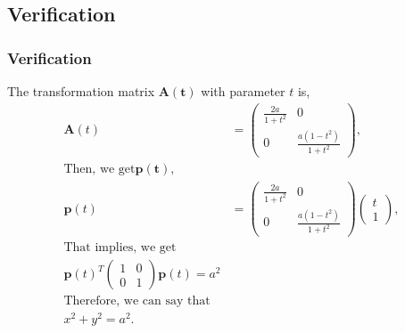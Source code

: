 \documentclass{beamer}
\theoremstyle{remark}
\newcommand{\myvec}[1]{\ensuremath{\begin{pmatrix}#1\end{pmatrix}}}
\let\vec\mathbf
\numberwithin{equation}{section}
\begin{document}
\subsection{Verification}
\begin{frame}
\frametitle{Verification}
	The transformation matrix $\vec{A(t)}$ with parameter $t$ is,\\
	\begin{align}
		\mathbf{A}(t) & = \myvec{ \frac{2a}{1+t^2} & 0 \\ 0 & \frac{a(1-t^2)}{1+t^2}},\\ \text{Then, we get} \vec{p(t)},\\ \mathbf{p}(t) & = \myvec{ \frac{2a}{1+t^2} & 0 \\ 0 & \frac{a(1 - t^2)}{1+t^2} } \myvec{t \\ 1},\\ \text{That implies, we get}\\ \mathbf{p}(t)^T \myvec{ 1 & 0 \\ 0 & 1} \mathbf{p}(t) = a^2\\ \text{Therefore, we can say that}\\
	x^2 + y^2 = a^2.
	\end{align}
\end{frame}
\end{document}
